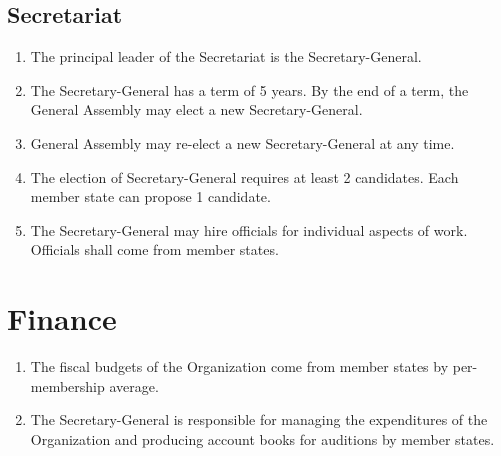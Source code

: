 \documentclass[11pt,a4paper]{article}
\begin{document}
\subsection{Secretariat}
\begin{enumerate}
	\item The principal leader of the Secretariat is the Secretary-General.
	\item The Secretary-General has a term of 5 years. By the end of a term, the General Assembly may elect a new Secretary-General.
	\item General Assembly may re-elect a new Secretary-General at any time.
	\item The election of Secretary-General requires at least 2 candidates. Each member state can propose 1 candidate.
	\item The Secretary-General may hire officials for individual aspects of work. Officials shall come from member states.
\end{enumerate}



\section{Finance}
\begin{enumerate}
	\item The fiscal budgets of the Organization come from member states by per-membership average.
	\item The Secretary-General is responsible for managing the expenditures of the Organization and
	      producing account books for auditions by member states.
\end{enumerate}
\end{document}
